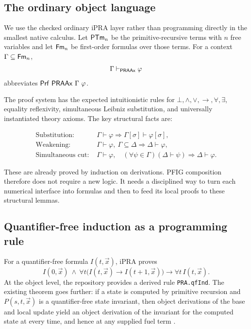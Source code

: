 \subsection{The ordinary object language}

We use the checked ordinary iPRA layer rather than programming directly in the smallest native calculus.  Let \(\mathsf{PTm}_n\) be the primitive-recursive terms with \(n\) free variables and let \(\mathsf{Fm}_n\) be first-order formulas over those terms.  For a context \(\Gamma\subseteq\mathsf{Fm}_n\),
\[
  \Gamma\vdash_{\mathsf{PRAAx}}\varphi
\]
abbreviates \(\mathsf{Prf}\ \mathsf{PRAAx}\ \Gamma\ \varphi\).

The proof system has the expected intuitionistic rules for \(\bot,\wedge,\vee,\to,\forall,\exists\), equality reflexivity, simultaneous Leibniz substitution, and universally instantiated theory axioms.  The key structural facts are:

\begin{align*}
\text{Substitution: }&
  \Gamma\vdash\varphi
  \Longrightarrow
  \Gamma[\sigma]\vdash\varphi[\sigma],\\
\text{Weakening: }&
  \Gamma\vdash\varphi,\ \Gamma\subseteq\Delta
  \Longrightarrow
  \Delta\vdash\varphi,\\
\text{Simultaneous cut: }&
  \Gamma\vdash\varphi,\quad
  (\forall\psi\in\Gamma)(\Delta\vdash\psi)
  \Longrightarrow
  \Delta\vdash\varphi.
\end{align*}

These are already proved by induction on derivations.  PFIG composition therefore does not require a new logic.  It needs a disciplined way to turn each numerical interface into formulas and then to feed its local proofs to these structural lemmas.

\subsection{Quantifier-free induction as a programming rule}

For a quantifier-free formula \(I(t,\vec{x})\), iPRA proves
\[
  I(0,\vec{x})\ \wedge\
  \forall t\bigl(I(t,\vec{x})\to I(t+1,\vec{x})\bigr)
  \to \forall t\,I(t,\vec{x}).
\]
At the object level, the repository provides a derived rule \texttt{PRA.qfInd}.  The existing  theorem goes further: if a state is computed by primitive recursion and \(P(s,t,\vec{x})\) is a quantifier-free state invariant, then object derivations of the base and local update yield an object derivation of the invariant for the computed state at every time, and hence at any supplied fuel term \cite{repo-local-global}.

